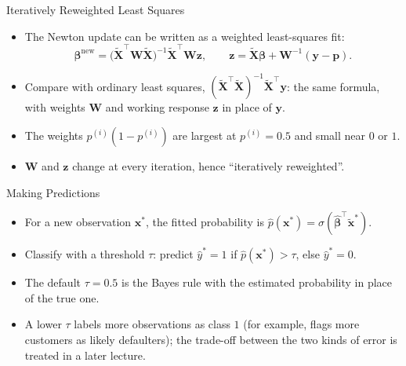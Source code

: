 \begin{frame}{Iteratively Reweighted Least Squares}
    \begin{itemize}
        \item The Newton update can be written as a weighted least-squares fit:
        \[
            \symbf{\beta}^{\text{new}} = \big( \tilde{\mathbf{X}}^\top \mathbf{W} \tilde{\mathbf{X}} \big)^{-1} \tilde{\mathbf{X}}^\top \mathbf{W} \mathbf{z}, \qquad \mathbf{z} = \tilde{\mathbf{X}} \symbf{\beta} + \mathbf{W}^{-1} (\mathbf{y} - \mathbf{p}).
        \]
        \item Compare with ordinary least squares, $(\tilde{\mathbf{X}}^\top \tilde{\mathbf{X}})^{-1} \tilde{\mathbf{X}}^\top \mathbf{y}$: the same formula, with weights $\mathbf{W}$ and working response $\mathbf{z}$ in place of $\mathbf{y}$.
        \item The weights $p^{(i)}(1 - p^{(i)})$ are largest at $p^{(i)} = 0.5$ and small near $0$ or $1$.
        \item $\mathbf{W}$ and $\mathbf{z}$ change at every iteration, hence ``iteratively reweighted''.%
    \end{itemize}
\end{frame}


\begin{frame}{Making Predictions}
    \begin{itemize}
        \item For a new observation $\mathbf{x}^\ast$, the fitted probability is $\hat{p}(\mathbf{x}^\ast) = \sigma(\hat{\symbf{\beta}}^\top \tilde{\mathbf{x}}^\ast)$.
        \item Classify with a threshold $\tau$: predict $\hat{y}^\ast = 1$ if $\hat{p}(\mathbf{x}^\ast) > \tau$, else $\hat{y}^\ast = 0$.
        \item The default $\tau = 0.5$ is the Bayes rule with the estimated probability in place of the true one.
        \item A lower $\tau$ labels more observations as class $1$ (for example, flags more customers as likely defaulters); the trade-off between the two kinds of error is treated in a later lecture.
    \end{itemize}
\end{frame}


